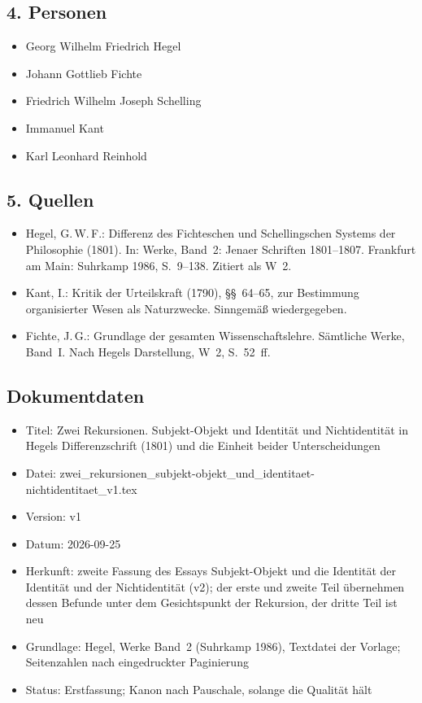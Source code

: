 \documentclass[11pt,a4paper]{article}
\begin{document}
\subsection*{4. Personen}
\begin{itemize}
\item Georg Wilhelm Friedrich Hegel
\item Johann Gottlieb Fichte
\item Friedrich Wilhelm Joseph Schelling
\item Immanuel Kant
\item Karl Leonhard Reinhold
\end{itemize}

\subsection*{5. Quellen}
\begin{itemize}
\item Hegel, G.\,W.\,F.: Differenz des Fichteschen und Schellingschen Systems der Philosophie (1801). In: Werke, Band~2: Jenaer Schriften 1801--1807. Frankfurt am Main: Suhrkamp 1986, S.~9--138. Zitiert als W~2.
\item Kant, I.: Kritik der Urteilskraft (1790), §§~64--65, zur Bestimmung organisierter Wesen als Naturzwecke. Sinngemäß wiedergegeben.
\item Fichte, J.\,G.: Grundlage der gesamten Wissenschaftslehre. Sämtliche Werke, Band~I. Nach Hegels Darstellung, W~2, S.~52~ff.
\end{itemize}

\subsection*{Dokumentdaten}
\begin{itemize}
\item Titel: Zwei Rekursionen. Subjekt-Objekt und Identität und Nichtidentität in Hegels Differenzschrift (1801) und die Einheit beider Unterscheidungen
\item Datei: zwei\_rekursionen\_subjekt-objekt\_und\_identitaet-nichtidentitaet\_v1.tex
\item Version: v1
\item Datum: 2026-09-25
\item Herkunft: zweite Fassung des Essays \glqq Subjekt-Objekt und die Identität der Identität und der Nichtidentität\grqq{} (v2); der erste und zweite Teil übernehmen dessen Befunde unter dem Gesichtspunkt der Rekursion, der dritte Teil ist neu
\item Grundlage: Hegel, Werke Band~2 (Suhrkamp 1986), Textdatei der Vorlage; Seitenzahlen nach eingedruckter Paginierung
\item Status: Erstfassung; Kanon nach Pauschale, solange die Qualität hält
\end{itemize}
\end{document}
